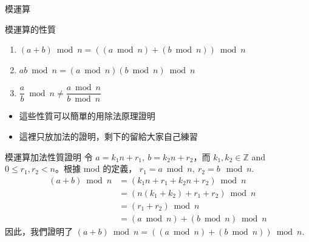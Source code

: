 \documentclass[aspectratio=169]{beamer}
\begin{document}
    \begin{frame}{模運算}
        \begin{alertblock}{模運算的性質}
            \begin{enumerate}
                \item $(a + b) \bmod n = ((a \bmod n) + (b \bmod n))\bmod n$
                \item $ab \bmod n = (a \bmod n) (b \bmod n) \bmod n$
                \item $\dfrac{a}{b} \bmod n \ne \dfrac{a \bmod n}{b \bmod n}$
            \end{enumerate}
        \end{alertblock}
        \begin{itemize}
            \item 這些性質可以簡單的用除法原理證明
            \item 這裡只放加法的證明，剩下的留給大家自己練習
        \end{itemize}
    \end{frame}
    
    \begin{frame}{模運算加法性質證明}
        令 $a = k_1n + r_1, \ b = k_2n + r_2$，而 $k_1,k_2 \in \mathbb{Z}$ and $0 \le r_1,r_2 < n$。根據 mod 的定義， $r_1 = a \bmod n, \ r_2 = b \mod n$.
        \begin{align*}
        (a+b) \bmod n &= (k_1n+r_1 + k_2n+r_2) \bmod n \\
                      &= (n(k_1+k_2) + r_1 + r_2) \bmod n \\
                      &= (r_1 + r_2) \bmod n \\
                      &= (a \bmod n) + (b \bmod n) \bmod n
        \end{align*}
        因此，我們證明了 $(a + b) \bmod n = ((a \bmod n) + (b \bmod n))\bmod n$.
    \end{frame}
    
\end{document}
